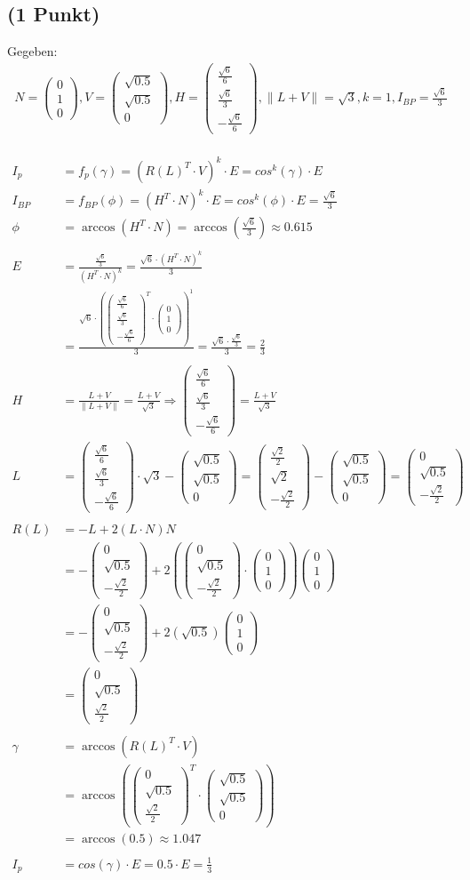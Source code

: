 \documentclass[a4paper,10pt,DIV=14]{article}
\begin{document}
\subsection{(1 Punkt)}%
\newcommand{\VecThree}[3]{\begin{pmatrix} #1 \\ #2 \\ #3 \end{pmatrix}}
Gegeben:
\begin{gather*}
N = \VecThree{0}{1}{0}, V = \VecThree{\sqrt{0.5}}{\sqrt{0.5}}{0}, H = \VecThree{\frac{\sqrt{6}}{6}}{\frac{\sqrt{6}}{3}}{-\frac{\sqrt{6}}{6}}, \lVert L+V \rVert = \sqrt{3}, k = 1, I_{BP} = \frac{\sqrt{6}}{3}
\end{gather*}
\\
\begin{align*}
I_p &= f_p(\gamma) = (R(L)^T \cdot V)^k \cdot E = cos^k(\gamma) \cdot E \\
I_{BP} &= f_{BP}(\phi) = (H^T \cdot N)^k \cdot E = cos^k(\phi) \cdot E = \frac{\sqrt{6}}{3}\\
\phi &= \arccos(H^T \cdot N) = \arccos\left(\frac{\sqrt{6}}{3}\right) \approx 0.615\\~\\
E &= \frac{\frac{\sqrt{6}}{3}}{(H^T \cdot N)^k} = \frac{\sqrt{6} \cdot (H^T \cdot N)^k}{3} \\
&= \frac{\sqrt{6} \cdot \left(\VecThree{\frac{\sqrt{6}}{6}}{\frac{\sqrt{6}}{3}}{-\frac{\sqrt{6}}{6}}^T \cdot \VecThree{0}{1}{0}\right)^1}{3} = \frac{\sqrt{6} \cdot \frac{\sqrt{6}}{3}}{3} =  \frac{2}{3}\\~\\
H &= \frac{L+V}{\lVert L+V \rVert} = \frac{L+V}{\sqrt{3}} \Rightarrow
\VecThree{\frac{\sqrt{6}}{6}}{\frac{\sqrt{6}}{3}}{-\frac{\sqrt{6}}{6}} = \frac{L+V}{\sqrt{3}} \\
L &= \VecThree{\frac{\sqrt{6}}{6}}{\frac{\sqrt{6}}{3}}{-\frac{\sqrt{6}}{6}} \cdot \sqrt{3} - \VecThree{\sqrt{0.5}}{\sqrt{0.5}}{0} = \VecThree{\frac{\sqrt{2}}{2}}{\sqrt{2}}{-\frac{\sqrt{2}}{2}} - \VecThree{\sqrt{0.5}}{\sqrt{0.5}}{0} = \VecThree{0}{\sqrt{0.5}}{-\frac{\sqrt{2}}{2}}\\~\\
R(L) &= - L + 2 \left(L \cdot N \right) N \\
&= - \VecThree{0}{\sqrt{0.5}}{-\frac{\sqrt{2}}{2}} + 2 \left(\VecThree{0}{\sqrt{0.5}}{-\frac{\sqrt{2}}{2}} \cdot \VecThree{0}{1}{0} \right) \VecThree{0}{1}{0} \\
&= - \VecThree{0}{\sqrt{0.5}}{-\frac{\sqrt{2}}{2}} + 2 \left( \sqrt{0.5} \right) \VecThree{0}{1}{0} \\ 
&= \VecThree{0}{\sqrt{0.5}}{\frac{\sqrt{2}}{2}}\\~\\
\gamma &= \arccos(R(L)^T \cdot V) \\
&= \arccos\left(\VecThree{0}{\sqrt{0.5}}{\frac{\sqrt{2}}{2}}^T \cdot \VecThree{\sqrt{0.5}}{\sqrt{0.5}}{0} \right) \\
&= \arccos(0.5) \approx 1.047\\~\\
I_p &= cos(\gamma) \cdot E = 0.5 \cdot E = \frac{1}{3}
\end{align*}
\end{document}
